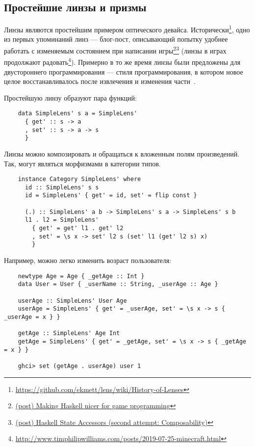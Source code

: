 \subsection{Простейшие линзы и призмы}

Линзы являются простейшим примером оптического девайса.
Исторически\footnote{\url{https://github.com/ekmett/lens/wiki/History-of-Lenses}}, одно из первых упоминаний линз --- блог-пост, описывающий попытку удобнее работать с изменяемым состоянием при написании игры\footnote{\href{https://web.archive.org/web/20140402193032/https://lukepalmer.wordpress.com/2007/07/26/making-haskell-nicer-for-game-programming/}{(post) Making Haskell nicer for game programming}}\footnote{\href{https://web.archive.org/web/20120303223802/https://lukepalmer.wordpress.com/2007/08/05/haskell-state-accessors-second-attempt-composability/}{(post) Haskell State Accessors (second attempt: Composability)}} (линзы в играх продолжают радовать\footnote{\url{http://www.timphilipwilliams.com/posts/2019-07-25-minecraft.html}}).
Примерно в то же время линзы были предложены для двустороннего программирования --- стиля программирования, в котором новое целое восстанавливалось после извлечения и изменения части~\cite{foster2008quotient}.

Простейшую линзу образуют пара функций:
\begin{verbatim}
    data SimpleLens' s a = SimpleLens'
      { get' :: s -> a
      , set' :: s -> a -> s
      }
\end{verbatim}

Линзы можно композировать и обращаться к вложенным полям произведений.
Так, могут являться морфизмами в категории типов.
\begin{verbatim}
    instance Category SimpleLens' where
      id :: SimpleLens' s s
      id = SimpleLens' { get' = id, set' = flip const }

      (.) :: SimpleLens' a b -> SimpleLens' s a -> SimpleLens' s b
      l1 . l2 = SimpleLens'
        { get' = get' l1 . get' l2
        , set' = \s x -> set' l2 s (set' l1 (get' l2 s) x)
        }
\end{verbatim}

Например, можно легко изменить возраст пользователя:
\begin{verbatim}
    newtype Age = Age { _getAge :: Int }
    data User = User { _userName :: String, _userAge :: Age }

    userAge :: SimpleLens' User Age
    userAge = SimpleLens' { get' = _userAge, set' = \s x -> s { _userAge = x } }

    getAge :: SimpleLens' Age Int
    getAge = SimpleLens' { get' = _getAge, set' = \s x -> s { _getAge = x } }

    ghci> set (getAge . userAge) user 1
\end{verbatim}

